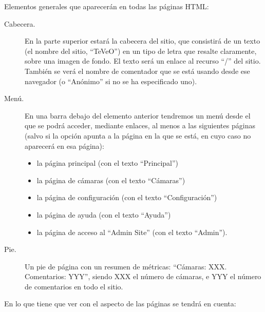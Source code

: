 Elementos generales que aparecerán en todas las páginas HTML:

\begin{description}
\item[Cabecera.] En la parte superior estará la cabecera del sitio, que consistirá de un texto (el nombre del sitio, ``TeVeO'') en un tipo de letra que resalte claramente, sobre una imagen de fondo. El texto será un enlace al recurso ``/'' del sitio. También se verá el nombre de comentador que se está usando desde ese navegador (o ``Anónimo'' si no se ha especificado uno).

\item[Menú.] En una barra debajo del elemento anterior tendremos un menú desde el que se podrá acceder, mediante enlaces, al menos a las siguientes páginas (salvo si la opción apunta a la página en la que se está, en cuyo caso no aparecerá en esa página):
  \begin{itemize}
  \item la página principal (con el texto ``Principal'')
  \item la página de cámaras (con el texto ``Cámaras'')
  \item la página de configuración (con el texto ``Configuración'')
  \item la página de ayuda (con el texto ``Ayuda'')
  \item la página de acceso al ``Admin Site'' (con el texto ``Admin''). 
  \end{itemize}

\item[Pie.] Un pie de página con un resumen de métricas: ``Cámaras: XXX. Comentarios: YYY'', siendo XXX el número de cámaras, e YYY el número de comentarios en todo el sitio.
\end{description}
  
En lo que tiene que ver con el aspecto de las páginas se tendrá en cuenta:

